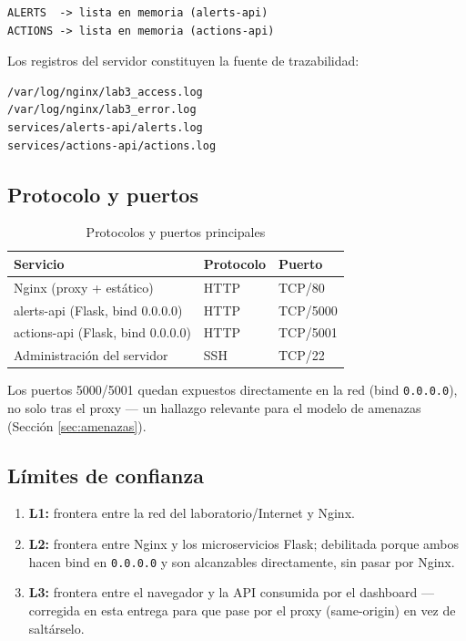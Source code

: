 \documentclass[journal]{IEEEtran}
\begin{document}
\begin{lstlisting}
ALERTS  -> lista en memoria (alerts-api)
ACTIONS -> lista en memoria (actions-api)
\end{lstlisting}

Los registros del servidor constituyen la fuente de trazabilidad:

\begin{lstlisting}[language=bash]
/var/log/nginx/lab3_access.log
/var/log/nginx/lab3_error.log
services/alerts-api/alerts.log
services/actions-api/actions.log
\end{lstlisting}

\subsection{Protocolo y puertos}

\begin{table}[H]
\centering
\caption{Protocolos y puertos principales}
\label{tab:protocolos}
\begin{tabular}{|p{2.7cm}|p{1.6cm}|p{2cm}|}
\hline
\textbf{Servicio} & \textbf{Protocolo} & \textbf{Puerto} \\
\hline
Nginx (proxy + estático) & HTTP & TCP/80 \\
\hline
alerts-api (Flask, bind 0.0.0.0) & HTTP & TCP/5000 \\
\hline
actions-api (Flask, bind 0.0.0.0) & HTTP & TCP/5001 \\
\hline
Administración del servidor & SSH & TCP/22 \\
\hline
\end{tabular}
\end{table}

Los puertos 5000/5001 quedan expuestos directamente en la red (bind
\texttt{0.0.0.0}), no solo tras el proxy --- un hallazgo relevante para el
modelo de amenazas (Sección \ref{sec:amenazas}).

\subsection{Límites de confianza}

\begin{enumerate}
    \item \textbf{L1:} frontera entre la red del laboratorio/Internet y Nginx.
    \item \textbf{L2:} frontera entre Nginx y los microservicios Flask;
    debilitada porque ambos hacen bind en \texttt{0.0.0.0} y son alcanzables
    directamente, sin pasar por Nginx.
    \item \textbf{L3:} frontera entre el navegador y la API consumida por el
    dashboard --- corregida en esta entrega para que pase por el proxy
    (same-origin) en vez de saltárselo.
\end{enumerate}
\end{document}
